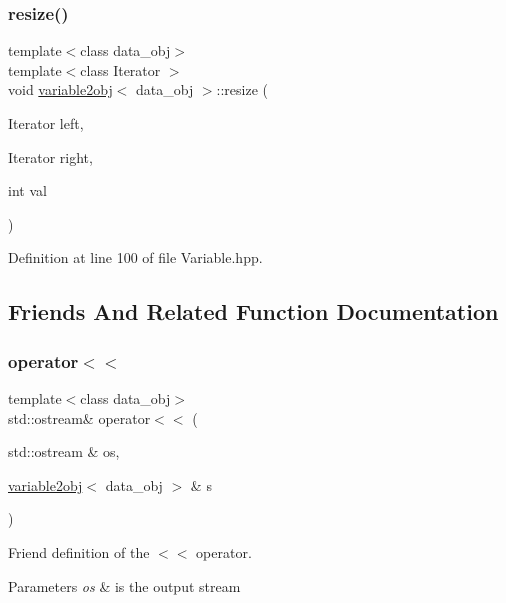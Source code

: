 \subsubsection{\texorpdfstring{resize()}{resize()}}
{\footnotesize\ttfamily template$<$class data\+\_\+obj$>$ \\
template$<$class Iterator $>$ \\
void \hyperlink{structvariable2obj}{variable2obj}$<$ data\+\_\+obj $>$\+::resize (\begin{DoxyParamCaption}\item[{Iterator}]{left,  }\item[{Iterator}]{right,  }\item[{int}]{val }\end{DoxyParamCaption})\hspace{0.3cm}{\ttfamily [inline]}}



Definition at line 100 of file Variable.\+hpp.



\subsection{Friends And Related Function Documentation}
\mbox{\label{structvariable2obj_a616565ebb782b844f30ef1e77bab6293}} 
\subsubsection{\texorpdfstring{operator$<$$<$}{operator<<}\hspace{0.1cm}{\footnotesize\ttfamily [1/2]}}
{\footnotesize\ttfamily template$<$class data\+\_\+obj$>$ \\
std\+::ostream\& operator$<$$<$ (\begin{DoxyParamCaption}\item[{std\+::ostream \&}]{os,  }\item[{\hyperlink{structvariable2obj}{variable2obj}$<$ data\+\_\+obj $>$ \&}]{s }\end{DoxyParamCaption})\hspace{0.3cm}{\ttfamily [friend]}}



Friend definition of the $<$$<$ operator. 


\begin{DoxyParams}{Parameters}
{\em os} & is the output stream \\
\hline
\end{DoxyParams}


